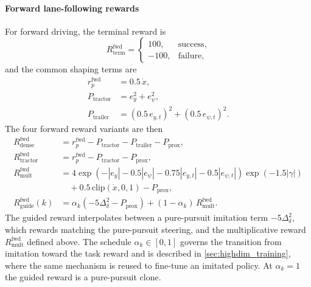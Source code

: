 \paragraph{Forward lane-following rewards}
For forward driving, the terminal reward is
\begin{equation}
R_{\mathrm{term}}^{\mathrm{fwd}} =
\begin{cases}
100, & \text{success}, \\
-100, & \text{failure},
\end{cases}
\end{equation}
and the common shaping terms are
\begin{align}
r_p^{\mathrm{fwd}} &= 0.5\,\dot{x}, \\
P_{\mathrm{tractor}} &= e_y^2 + e_\psi^2, \\
P_{\mathrm{trailer}} &= (0.5\,e_{y,t})^2 + (0.5\,e_{\psi,t})^2.
\end{align}
The four forward reward variants are then
\begin{align}
R_{\mathrm{dense}}^{\mathrm{fwd}} &= r_p^{\mathrm{fwd}} - P_{\mathrm{tractor}} - P_{\mathrm{trailer}} - P_{\mathrm{prox}},
\\
R_{\mathrm{tractor}}^{\mathrm{fwd}} &= r_p^{\mathrm{fwd}} - P_{\mathrm{tractor}} - P_{\mathrm{prox}},
\\
R_{\mathrm{mult}}^{\mathrm{fwd}} &= 4\exp\!\left(-|e_y|-0.5|e_\psi|-0.75|e_{y,t}|-0.5|e_{\psi,t}|\right)\exp\!\left(-1.5|\gamma|\right) \nonumber\\
&\quad + 0.5\,\mathrm{clip}(\dot{x}, 0, 1) - P_{\mathrm{prox}},
\\
R_{\mathrm{guide}}^{\mathrm{fwd}}(k) &= \alpha_k
\left(-5\Delta_\delta^2 - P_{\mathrm{prox}}\right)
+ (1-\alpha_k)\,R_{\mathrm{mult}}^{\mathrm{fwd}}.
\end{align}
The guided reward interpolates between a pure-pursuit imitation term $-5\Delta_\delta^2$,
which rewards matching the pure-pursuit steering, and the multiplicative reward
$R_{\mathrm{mult}}^{\mathrm{fwd}}$ defined above. The schedule $\alpha_k \in [0,1]$ governs
the transition from imitation toward the task reward and is described in
\cref{sec:highdim_training}, where the same mechanism is reused to fine-tune an imitated
policy. At $\alpha_k = 1$ the guided reward is a pure-pursuit clone.

